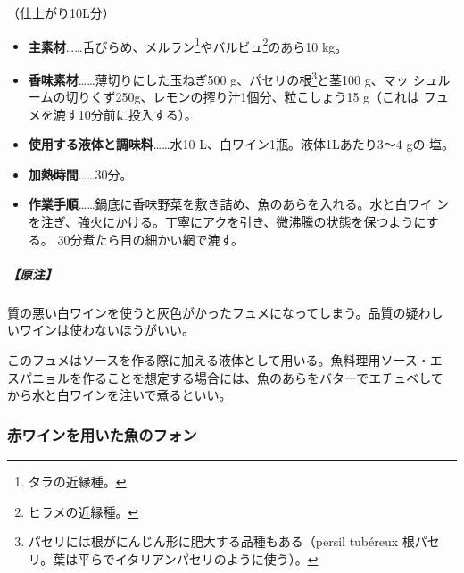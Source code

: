 \begin{recette}

（仕上がり10L分）

\begin{itemize}
\item
  \textbf{主素材}\ldots{}\ldots{}舌びらめ、メルラン\footnote{タラの近縁種。}やバルビュ\footnote{ヒラメの近縁種。}のあら10
  kg。
\item
  \textbf{香味素材}\ldots{}\ldots{}薄切りにした玉ねぎ500
  g、パセリの根\footnote{パセリには根がにんじん形に肥大する品種もある（persil
    tubéreux 根パセリ。葉は平らでイタリアンパセリのように使う）。}と茎100
  g、マッ シュルームの切りくず250g、レモンの搾り汁1個分、粒こしょう15
  g（これは フュメを漉す10分前に投入する）。
\item
  \textbf{使用する液体と調味料}\ldots{}\ldots{}水10
  L、白ワイン1瓶。液体1Lあたり3〜4 gの 塩。
\item
  \textbf{加熱時間}\ldots{}\ldots{}30分。
\item
  \textbf{作業手順}\ldots{}\ldots{}鍋底に香味野菜を敷き詰め、魚のあらを入れる。水と白ワイ
  ンを注ぎ、強火にかける。丁寧にアクを引き、微沸騰の状態を保つようにする。
  30分煮たら目の細かい網で漉す。
\end{itemize}

\hypertarget{nota-fumet-de-poisson}{%
\subparagraph{【原注】}\label{nota-fumet-de-poisson}}

質の悪い白ワインを使うと灰色がかったフュメになってしまう。品質の疑わし
いワインは使わないほうがいい。

このフュメはソースを作る際に加える液体として用いる。魚料理用ソース・エ
スパニョルを作ることを想定する場合には、魚のあらをバターでエチュベして
から水と白ワインを注いで煮るといい。

\maeaki

\hypertarget{fonds-de-poisson-au-vin-rouge}{%
\subsubsection{赤ワインを用いた魚のフォン}\label{fonds-de-poisson-au-vin-rouge}}




\end{recette}

